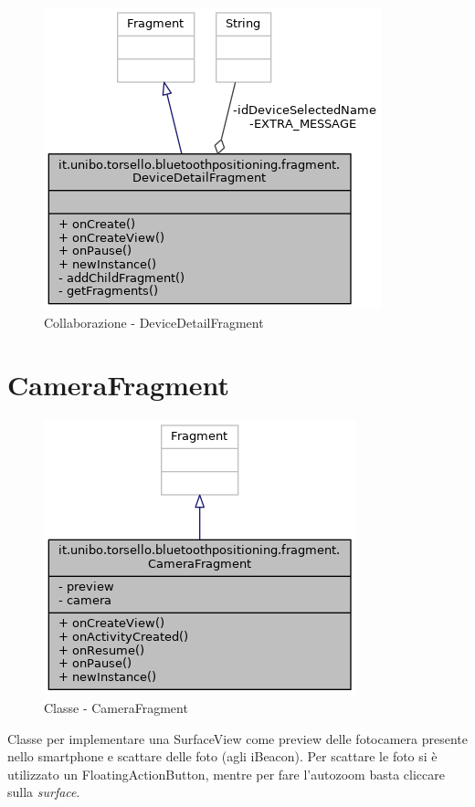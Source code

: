 \begin{figure}[ph]
	\centering
	\includegraphics[width=0.7\linewidth]{img/uml/class/classit_1_1unibo_1_1torsello_1_1bluetoothpositioning_1_1fragment_1_1DeviceDetailFragment__coll__graph.png}
	\caption{Collaborazione - DeviceDetailFragment}
\end{figure}

\newpage
\section{CameraFragment}
\begin{figure}[ph]
	\centering
	\includegraphics[width=0.5\linewidth]{img/uml/class/classit_1_1unibo_1_1torsello_1_1bluetoothpositioning_1_1fragment_1_1CameraFragment__inherit__graph.png}
	\caption{Classe - CameraFragment}
\end{figure}

Classe per implementare una SurfaceView come preview delle fotocamera presente nello smartphone e scattare delle foto (agli iBeacon). Per scattare le foto si è utilizzato un FloatingActionButton, mentre per fare l'autozoom basta cliccare sulla \textit{surface}.

